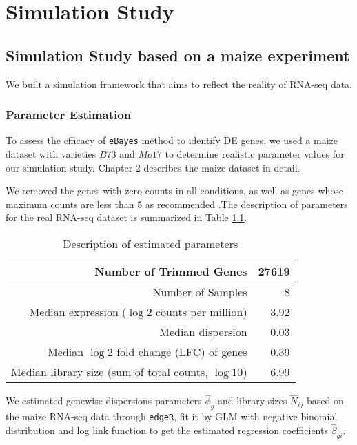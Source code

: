 \chapter{Simulation Study}

\section{Simulation Study based on a maize experiment}

We built a simulation framework that aims to reflect the reality of RNA-seq data. 

\subsection{Parameter Estimation}

To assess the efficacy of \texttt{eBayes} method to identify DE genes, we used a maize dataset with varieties $B73$ and $Mo17$ \citep{paschold2012complementation} to determine realistic parameter values for our simulation study. Chapter 2 describes the maize dataset in detail. 

We removed the genes with zero counts in all conditions, as well as genes whose maximum counts are less than $5$ as recommended \citep{rau2013data}.The description of parameters for the real RNA-seq dataset is summarized in Table \ref{tab:Parameter-Estimation}. 

\begin{table}[ht]
\centering
\begin{tabular}{|r|r|}
\hline
Number of Trimmed Genes & 27619 \\ 
\hline
Number of Samples & 8\\
\hline
  Median expression ($\log{2}$ counts per million) & 3.92 \\ 
  \hline
  Median dispersion & 0.03 \\ 
  \hline
  Median $\log{2}$ fold change (LFC) of genes & 0.39 \\ 
  \hline
  Median library size (sum of total counts, $\log{10}$) & 6.99 \\ 
   \hline
\end{tabular}

\caption{Description of estimated parameters}
\label{tab:Parameter-Estimation}


\end{table}

We estimated genewise dispersions parameters $\hat{\phi}_g$ and library sizes $\hat{N}_{ij}$ based on the maize RNA-seq data \citep{paschold2012complementation} through {\tt edgeR}, fit it by GLM with negative binomial distribution and log link function to get the estimated regression coefficients $\hat{\beta}_{gi}$. 

